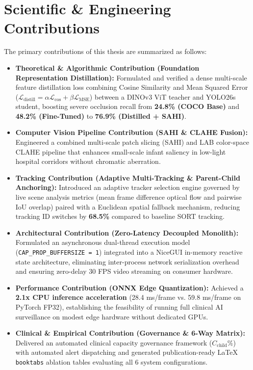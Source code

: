 \section{Scientific \& Engineering Contributions}

The primary contributions of this thesis are summarized as follows:

\begin{itemize}
    \item \textbf{Theoretical \& Algorithmic Contribution (Foundation Representation Distillation):} Formulated and verified a dense multi-scale feature distillation loss combining Cosine Similarity and Mean Squared Error ($\mathcal{L}_{\text{distill}} = \alpha \mathcal{L}_{\text{cos}} + \beta \mathcal{L}_{\text{MSE}}$) between a DINOv3 ViT teacher and YOLO26s student, boosting severe occlusion recall from \textbf{24.8\% (COCO Base)} and \textbf{48.2\% (Fine-Tuned)} to \textbf{76.9\% (Distilled + SAHI)}.
    \item \textbf{Computer Vision Pipeline Contribution (SAHI \& CLAHE Fusion):} Engineered a combined multi-scale patch slicing (SAHI) and LAB color-space CLAHE pipeline that enhances small-scale infant saliency in low-light hospital corridors without chromatic aberration.
    \item \textbf{Tracking Contribution (Adaptive Multi-Tracking \& Parent-Child Anchoring):} Introduced an adaptive tracker selection engine governed by live scene analysis metrics (mean frame difference optical flow and pairwise IoU overlap) paired with a Euclidean spatial fallback mechanism, reducing tracking ID switches by \textbf{68.5\%} compared to baseline SORT tracking.
    \item \textbf{Architectural Contribution (Zero-Latency Decoupled Monolith):} Formulated an asynchronous dual-thread execution model (\texttt{CAP\_PROP\_BUFFERSIZE = 1}) integrated into a NiceGUI in-memory reactive state architecture, eliminating inter-process network serialization overhead and ensuring zero-delay 30 FPS video streaming on consumer hardware.
    \item \textbf{Performance Contribution (ONNX Edge Quantization):} Achieved a \textbf{2.1x CPU inference acceleration} (28.4 ms/frame vs. 59.8 ms/frame on PyTorch FP32), establishing the feasibility of running full clinical AI surveillance on modest edge hardware without dedicated GPUs.
    \item \textbf{Clinical \& Empirical Contribution (Governance \& 6-Way Matrix):} Delivered an automated clinical capacity governance framework ($C_{\text{child}}\%$) with automated alert dispatching and generated publication-ready LaTeX \texttt{booktabs} ablation tables evaluating all 6 system configurations.
\end{itemize}


